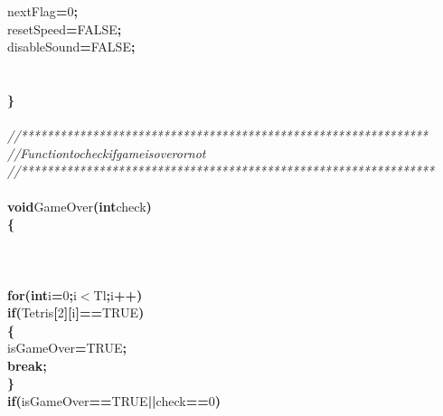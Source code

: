 \documentclass[a4paper, 10pt]{article}
\newcommand\SPC{\hspace*{0.6em}}
\newcommand{\CppAComment}[1]{\textit{\textcolor[rgb]{0.2,0.6,1}{#1}}}
\newcommand{\CppAIdentifier}[1]{#1}
\newcommand{\CppANumber}[1]{\textcolor[rgb]{0.5,0,0.5}{#1}}
\newcommand{\CppAReservedWord}[1]{\textbf{#1}}
\newcommand{\CppASpace}[1]{\colorbox[rgb]{1,1,1}{#1}}
\newcommand{\CppASymbol}[1]{\textbf{\textcolor[rgb]{1,0,0}{#1}}}
\begin{document}
\begin{ttfamily}
\CppASpace{\SPC }\CppAIdentifier{nextFlag}\CppASymbol{=}\CppANumber{0}\CppASymbol{;}\\
\CppASpace{\SPC }\CppAIdentifier{resetSpeed}\CppASymbol{=}\CppAIdentifier{FALSE}\CppASymbol{;}\\
\CppASpace{\SPC }\CppAIdentifier{disableSound}\CppASymbol{=}\CppAIdentifier{FALSE}\CppASymbol{;}\\
\\
\\
\CppASymbol{\}}\\
\\
\CppAComment{//***************************************************************}\\
\CppAComment{//\SPC \SPC \SPC Function\SPC to\SPC check\SPC if\SPC game\SPC is\SPC over\SPC or\SPC not}\\
\CppAComment{//****************************************************************}\\
\\
\CppAReservedWord{void}\CppASpace{\SPC }\CppAIdentifier{GameOver}\CppASymbol{(}\CppAReservedWord{int}\CppASpace{\SPC }\CppAIdentifier{check}\CppASymbol{)}\\
\CppASymbol{\{}\\
\\
\\
\\
\CppASpace{\SPC }\CppAReservedWord{for}\CppASymbol{(}\CppAReservedWord{int}\CppASpace{\SPC }\CppAIdentifier{i}\CppASymbol{=}\CppANumber{0}\CppASymbol{;}\CppAIdentifier{i}\CppASymbol{$<$}\CppAIdentifier{Tl}\CppASymbol{;}\CppAIdentifier{i}\CppASymbol{++}\CppASymbol{)}\\
\CppASpace{\SPC \SPC }\CppAReservedWord{if}\CppASymbol{(}\CppAIdentifier{Tetris}\CppASymbol{[}\CppANumber{2}\CppASymbol{]}\CppASymbol{[}\CppAIdentifier{i}\CppASymbol{]}\CppASymbol{==}\CppAIdentifier{TRUE}\CppASymbol{)}\\
\CppASpace{\SPC \SPC }\CppASymbol{\{}\\
\CppASpace{\SPC \SPC \SPC }\CppAIdentifier{isGameOver}\CppASymbol{=}\CppAIdentifier{TRUE}\CppASymbol{;}\\
\CppASpace{\SPC \SPC \SPC }\CppAReservedWord{break}\CppASymbol{;}\\
\CppASpace{\SPC \SPC }\CppASymbol{\}}\\
\CppASpace{\SPC }\CppAReservedWord{if}\CppASymbol{(}\CppAIdentifier{isGameOver}\CppASymbol{==}\CppAIdentifier{TRUE}\CppASpace{\SPC }\CppASymbol{||}\CppASpace{\SPC }\CppAIdentifier{check}\CppASymbol{==}\CppANumber{0}\CppASymbol{)}\\

\end{ttfamily}
\end{document}
